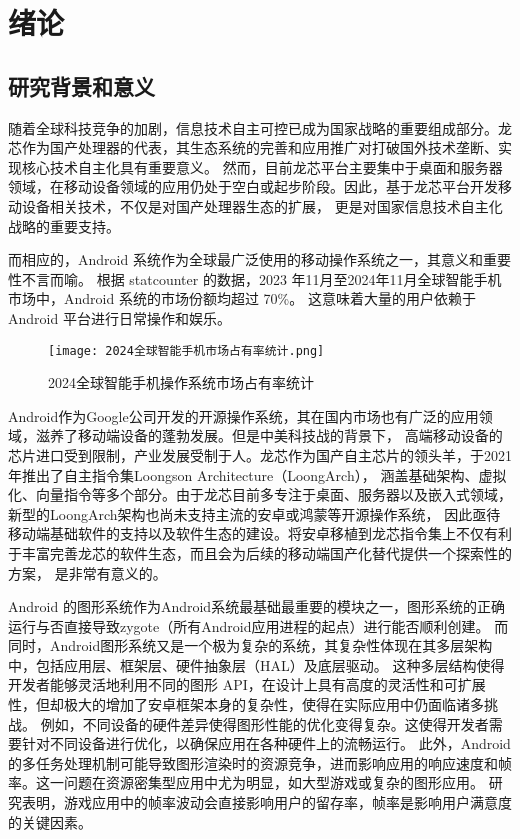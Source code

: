 
\chapter{绪论}

\section{研究背景和意义}

随着全球科技竞争的加剧，信息技术自主可控已成为国家战略的重要组成部分。龙芯作为国产处理器的代表，其生态系统的完善和应用推广对打破国外技术垄断、实现核心技术自主化具有重要意义。
然而，目前龙芯平台主要集中于桌面和服务器领域，在移动设备领域的应用仍处于空白或起步阶段。因此，基于龙芯平台开发移动设备相关技术，不仅是对国产处理器生态的扩展，
更是对国家信息技术自主化战略的重要支持。

而相应的，Android 系统作为全球最广泛使用的移动操作系统之一，其意义和重要性不言而喻。
根据 statcounter 的数据，2023 年11月至2024年11月全球智能手机市场中，Android 系统的市场份额均超过 70\%\cite{MobileMarket}。
这意味着大量的用户依赖于 Android 平台进行日常操作和娱乐。
\begin{figure}[h]
    \centering
    \texttt{[image: 2024全球智能手机市场占有率统计.png]}
    \caption{2024全球智能手机操作系统市场占有率统计}\cite{MobileMarket}
  \end{figure}
Android作为Google公司开发的开源操作系统，其在国内市场也有广泛的应用领域，滋养了移动端设备的蓬勃发展。但是中美科技战的背景下，
高端移动设备的芯片进口受到限制，产业发展受制于人。龙芯作为国产自主芯片的领头羊，于2021年推出了自主指令集Loongson Architecture（LoongArch）\cite{Loongarch}，
涵盖基础架构、虚拟化、向量指令等多个部分。由于龙芯目前多专注于桌面、服务器以及嵌入式领域，新型的LoongArch架构也尚未支持主流的安卓或鸿蒙等开源操作系统，
因此亟待移动端基础软件的支持以及软件生态的建设。将安卓移植到龙芯指令集上不仅有利于丰富完善龙芯的软件生态，而且会为后续的移动端国产化替代提供一个探索性的方案，
是非常有意义的。

Android 的图形系统作为Android系统最基础最重要的模块之一，图形系统的正确运行与否直接导致zygote（所有Android应用进程的起点）进行能否顺利创建。
而同时，Android图形系统又是一个极为复杂的系统，其复杂性体现在其多层架构中，包括应用层、框架层、硬件抽象层（HAL）及底层驱动。
这种多层结构使得开发者能够灵活地利用不同的图形 API，在设计上具有高度的灵活性和可扩展性，但却极大的增加了安卓框架本身的复杂性，使得在实际应用中仍面临诸多挑战。
例如，不同设备的硬件差异使得图形性能的优化变得复杂。这使得开发者需要针对不同设备进行优化，以确保应用在各种硬件上的流畅运行。
此外，Android 的多任务处理机制可能导致图形渲染时的资源竞争，进而影响应用的响应速度和帧率。这一问题在资源密集型应用中尤为明显，如大型游戏或复杂的图形应用。
研究表明，游戏应用中的帧率波动会直接影响用户的留存率，帧率是影响用户满意度的关键因素\cite{2006The}。

